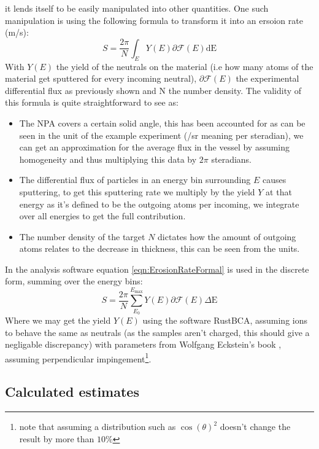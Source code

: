 \documentclass{article}
\begin{document}
it lends itself to be easily manipulated into other quantities. One such manipulation
is using the following formula to transform it into an ersoion rate (m/s):
\begin{equation}
    S = \frac{2\pi}{N} \int_E Y(E)\partial\mathcal{F} (E) \text{dE}
    \label{eqn:ErosionRateFormal}
\end{equation}
With $Y(E)$ the yield of the neutrals on the material (i.e how many atoms of
the material get sputtered for every incoming neutral), $\partial\mathcal{F}(E)$ the
experimental differential flux as previously shown and N the number density.
The validity of this formula is quite straightforward to see as:
\begin{itemize}
    \item The NPA covers a certain solid angle, this has been accounted for as
        can be seen in the unit of the example experiment (/sr meaning per
        steradian), we can get an approximation for the average
        flux in the vessel by assuming homogeneity and thus multiplying this
data by $2\pi$ steradians. 
    \item The differential flux of particles in an energy bin surrounding $E$ causes sputtering, to get this
        sputtering rate we multiply by the yield $Y$ at that energy as it's defined to be the
        outgoing atoms per incoming, we integrate over all energies to get the
        full contribution. 
    \item The number density of the target $N$ dictates how the amount of
        outgoing atoms relates to the decrease in thickness, this can be seen from the units.
\end{itemize}
In the analysis software equation \ref{eqn:ErosionRateFormal} is used in the discrete form,
summing over the energy bins:
\begin{equation}
S = \frac{2\pi}{N}\sum_{E_0}^{E_{\text{max}}} Y(E)\partial\mathcal{F}(E)\Delta\text{E}
    \label{eqn:ErosionRateFinite}
\end{equation}
Where we may get the yield $Y(E)$ using the software RustBCA\cite{RustBCA},
assuming ions to behave the same as neutrals (as the samples aren't charged,
this should give a negligable discrepancy) with parameters from Wolfgang Eckstein's
book \cite{eckstein2013computer}, assuming perpendicular impingement\footnote{note that
assuming a distribution such as $\cos(\theta)^2$ doesn't change the result by more than $10\%$}.
\subsection{Calculated estimates}



\end{document}
